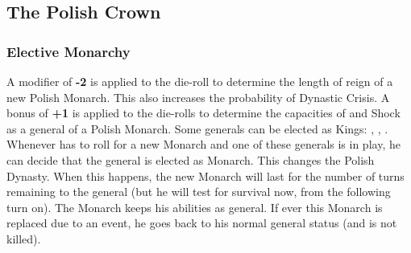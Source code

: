 
\subsection{The Polish Crown}
\subsubsection{Elective Monarchy}
\bparag A modifier of {\bf -2} is applied to the die-roll to determine
the length of reign of a new Polish Monarch. This also increases the
probability of Dynastic Crisis.\label{chSpecific:Poland:King Duration}
\bparag A bonus of {\bf +1} is applied to the die-rolls to determine the
capacities of \Man and Shock as a general of a Polish Monarch.
\bparag Some generals can be elected as Kings: ,
, . Whenever \POL has to roll for a new
Monarch and one of these generals is in play, he can decide that the
general is elected as Monarch. This changes the Polish Dynasty.
\bparag When this happens, the new Monarch will last for the number of
turns remaining to the general (but he will test for survival now, from
the following turn on). The Monarch keeps his abilities as general.
\bparag If ever this Monarch is replaced due to an event, he goes back
to his normal general status (and is not killed).

